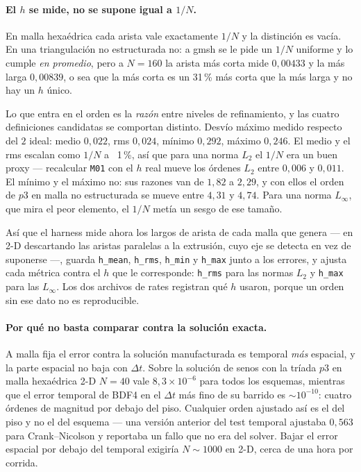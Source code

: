 \documentclass[11pt,a4paper]{article}
\newcommand{\code}[1]{\texttt{\small #1}}
\begin{document}
\paragraph{El $h$ se mide, no se supone igual a $1/N$.} En malla hexaédrica cada arista vale
exactamente $1/N$ y la distinción es vacía. En una triangulación no estructurada no: a gmsh se
le pide un $1/N$ uniforme y lo cumple \emph{en promedio}, pero a $N=160$ la arista más corta
mide $0{,}00433$ y la más larga $0{,}00839$, o sea que la más corta es un 31\,\% más corta que
la más larga y no hay un $h$ único.

Lo que entra en el orden es la \emph{razón} entre niveles de refinamiento, y las cuatro
definiciones candidatas se comportan distinto. Desvío máximo medido respecto del $2$ ideal:
medio $0{,}022$, rms $0{,}024$, mínimo $0{,}292$, máximo $0{,}246$. El medio y el rms escalan
como $1/N$ a ~1\,\%, así que para una norma $L_2$ el $1/N$ era un buen proxy --- recalcular
\code{M01} con el $h$ real mueve los órdenes $L_2$ entre $0{,}006$ y $0{,}011$. El mínimo y el
máximo no: sus razones van de $1{,}82$ a $2{,}29$, y con ellos el orden de $p3$ en malla no
estructurada se mueve entre $4{,}31$ y $4{,}74$. Para una norma $L_\infty$, que mira el peor
elemento, el $1/N$ metía un sesgo de ese tamaño.

Así que el harness mide ahora los largos de arista de cada malla que genera --- en 2-D
descartando las aristas paralelas a la extrusión, cuyo eje se detecta en vez de suponerse ---,
guarda \code{h\_mean}, \code{h\_rms}, \code{h\_min} y \code{h\_max} junto a los errores, y
ajusta cada métrica contra el $h$ que le corresponde: \code{h\_rms} para las normas $L_2$ y
\code{h\_max} para las $L_\infty$. Los dos archivos de rates registran qué $h$ usaron, porque un
orden sin ese dato no es reproducible.

\paragraph{Por qué no basta comparar contra la solución exacta.} A malla fija el
error contra la solución manufacturada es temporal \emph{más} espacial, y la
parte espacial no baja con $\Delta t$. Sobre la solución de senos con la tríada
$p3$ en malla hexaédrica 2-D $N=40$ vale $8{,}3\times10^{-6}$ para todos los
esquemas, mientras que el error temporal de BDF4 en el $\Delta t$ más fino de su
barrido es $\sim10^{-10}$: cuatro órdenes de magnitud por debajo del piso.
Cualquier orden ajustado así es el del piso y no el del esquema --- una versión
anterior del test temporal ajustaba $0{,}563$ para Crank--Nicolson y reportaba un
fallo que no era del solver. Bajar el error espacial por debajo del temporal
exigiría $N\sim1000$ en 2-D, cerca de una hora por corrida.
\end{document}
